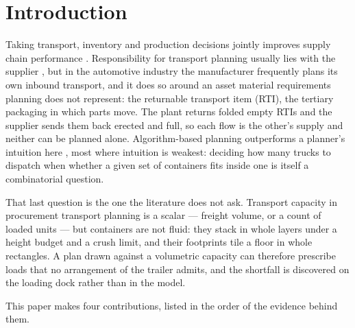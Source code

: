 \section{Introduction}
\label{sec:intro}

Taking transport, inventory and production decisions jointly improves
supply chain performance \autocite{Stadtler2015SupplyPlanning,
Diaz-Madronero2017ADecisions}. Responsibility for transport planning
usually lies with the supplier
\autocite{Fleischmann2015TransportDistribution}, but in the automotive
industry the manufacturer frequently plans its own inbound transport,
and it does so around an asset material requirements planning does not
represent: the returnable transport item (RTI), the tertiary packaging
in which parts move. The plant returns folded empty RTIs and the
supplier sends them back erected and full, so each flow is the other's
supply and neither can be planned alone. Algorithm-based planning
outperforms a planner's intuition here
\autocite{Diaz-Madronero2014AChain}, most where intuition is weakest:
deciding how many trucks to dispatch when whether a given set of
containers fits inside one is itself a combinatorial question.

That last question is the one the literature does not ask. Transport
capacity in procurement transport planning is a scalar --- freight
volume, or a count of loaded units
\autocite{Hashemi-Amiri2023IntegratedApproach,
Diaz-Madronero2014AChain} --- but containers are not fluid: they stack
in whole layers under a height budget and a crush limit, and their
footprints tile a floor in whole rectangles. A plan drawn against a
volumetric capacity can therefore prescribe loads that no arrangement
of the trailer admits, and the shortfall is discovered on the loading
dock rather than in the model.

This paper makes four contributions, listed in the order of the
evidence behind them.

